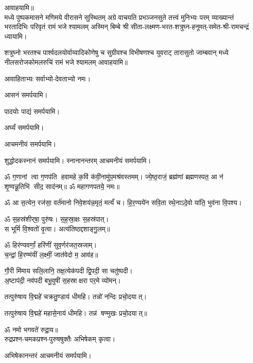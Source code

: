 \begin{center}
आवाहयामि॥\\

{मध्ये पुष्पकमासने मणिमये वीरासने सुस्थितम्}
{अग्रे वाचयति प्रभञ्जनसुते तत्त्वं मुनिभ्यः परम्}
{व्याख्यान्तं भरतादिभिः परिवृतं रामं भजे श्यामलम्}
अस्मिन् बिम्बे श्री सीता-लक्ष्मण-भरत-शत्रुघ्न-हनूमत्-समेत-श्री-रामचन्द्रं ध्यायामि। 

{शत्रुघ्नो भरतश्च पार्श्वदलयोर्वाय्वादिकोणेषु च}
{सुग्रीवश्च विभीषणश्च युवराट् तारासुतो जाम्बवान्}
{मध्ये नीलसरोजकोमलरुचिं रामं भजे श्यामलम्}
आवाहयामि॥\\\medskip

आवाहिताभ्यः सर्वाभ्यो-देवताभ्यो नमः।

आसनं समर्पयामि।

पादयोः पाद्यं समर्पयामि।

अर्घ्यं समर्पयामि।

आचमनीयं समर्पयामि।

शुद्धोदकस्नानं समर्पयामि। स्नानानन्तरम् आचमनीयं समर्पयामि।



ॐ ग॒णानां त्वा ग॒णप॑ति हवामहे क॒विं क॑वी॒नामु॑प॒मश्र॑\-वस्तमम्। 
ज्ये॒ष्ठ॒राजं॒ ब्रह्म॑णां ब्रह्मणस्पत॒ आ न॑ शृ॒ण्वन्नू॒तिभि॑ सीद॒ साद॑नम्॥ 
ॐ महागणपतये॒ नमः॥ 

ॐ आ स॒त्येन॒ रज॑सा॒ वर्त॑मानो निवे॒शय॑न्न॒मृतं॒ मर्त्यं॑ च। हि॒र॒ण्यये॑न सवि॒ता रथे॒नाऽदे॒वो या॑ति॒ भुव॑ना वि॒पश्य\sn{}।

ॐ स॒हस्र॑शीर्‌षा॒ पुरु॑षः। स॒ह॒स्रा॒क्षः स॒हस्र॑पात्।\\
स भूमिं॑ वि॒श्वतो॑ वृ॒त्वा। अत्य॑तिष्ठद्दशाङ्गु॒लम्॥

ॐ हिर॑ण्यवर्णां॒ हरि॑णीं सुव॒र्णर॑जत॒स्रजाम्।\\
च॒न्द्रां॒ हि॒रण्म॑यीं ल॒क्ष्मीं॒ जात॑वेदो म॒ आव॑ह॥

गौ॒री मि॑माय सलि॒लानि॒ तक्ष॒त्येक॑पदी द्वि॒पदी॒ सा चतु॑ष्पदी।\\
अ॒ष्टाप॑दी॒ नव॑पदी बभू॒वुषी॑ स॒हस्राक्षरा पर॒मे व्यो॑मन्।

तत्पुरु॑षाय वि॒द्महे॑ चक्रतु॒ण्डाय॑ धीमहि। तन्नो॑ नन्दिः प्रचो॒दयात्। 

तत्पुरु॑षाय वि॒द्महे॑ महासे॒नाय॑ धीमहि। तन्न॑ षण्मुखः प्रचो॒दयात्॥


ॐ नमो भगवते॑ रुद्रा॒य॥\\
रुद्रप्रश्न-चमकप्रश्न-पुरुषषुक्तैः अभिषेकम् कृत्वा।


अभिषेकानन्तरं आचमनीयं समर्पयामि।


\end{center}
